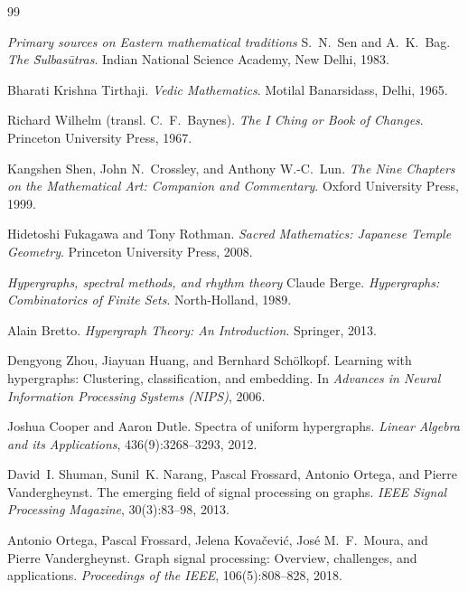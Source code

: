 \documentclass[12pt]{article}
\numberwithin{equation}{section}
\theoremstyle{plain}
\theoremstyle{definition}
\theoremstyle{remark}
\begin{document}
\newpage
\begin{thebibliography}{99}

\item[] \textit{Primary sources on Eastern mathematical traditions}
S.~N.~Sen and A.~K.~Bag.
\newblock \emph{The \={S}ulbas\=utras}.
\newblock Indian National Science Academy, New Delhi, 1983.

Bharati Krishna Tirthaji.
\newblock \emph{Vedic Mathematics}.
\newblock Motilal Banarsidass, Delhi, 1965.

Richard Wilhelm (transl. C.~F.~Baynes).
\newblock \emph{The I Ching or Book of Changes}.
\newblock Princeton University Press, 1967.

Kangshen Shen, John N.~Crossley, and Anthony W.-C.~Lun.
\newblock \emph{The Nine Chapters on the Mathematical Art: Companion and Commentary}.
\newblock Oxford University Press, 1999.

Hidetoshi Fukagawa and Tony Rothman.
\newblock \emph{Sacred Mathematics: Japanese Temple Geometry}.
\newblock Princeton University Press, 2008.

\item[] \textit{Hypergraphs, spectral methods, and rhythm theory}
Claude Berge.
\newblock \emph{Hypergraphs: Combinatorics of Finite Sets}.
\newblock North-Holland, 1989.

Alain Bretto.
\newblock \emph{Hypergraph Theory: An Introduction}.
\newblock Springer, 2013.

Dengyong Zhou, Jiayuan Huang, and Bernhard Sch\"olkopf.
\newblock Learning with hypergraphs: Clustering, classification, and embedding.
\newblock In \emph{Advances in Neural Information Processing Systems (NIPS)}, 2006.

Joshua Cooper and Aaron Dutle.
\newblock Spectra of uniform hypergraphs.
\newblock \emph{Linear Algebra and its Applications}, 436(9):3268--3293, 2012.

David~I. Shuman, Sunil~K. Narang, Pascal Frossard, Antonio Ortega, and Pierre Vandergheynst.
\newblock The emerging field of signal processing on graphs.
\newblock \emph{IEEE Signal Processing Magazine}, 30(3):83--98, 2013.

Antonio Ortega, Pascal Frossard, Jelena Kova\v{c}evi\'{c}, Jos\'{e} M.~F.~Moura, and Pierre Vandergheynst.
\newblock Graph signal processing: Overview, challenges, and applications.
\newblock \emph{Proceedings of the IEEE}, 106(5):808--828, 2018.


\end{thebibliography}
\end{document}
